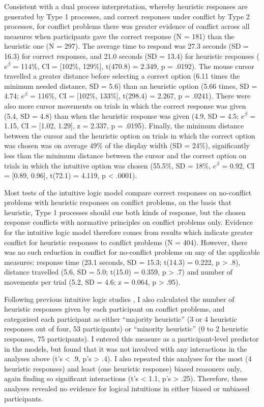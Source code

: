 Consistent with a dual process interpretation, 
whereby heuristic responses are generated by Type 1 processes,
and correct responses under conflict by Type 2 processes,
for conflict problems there was greater evidence of conflict
across all measures when participants gave the correct response (N = 181) 
than the heuristic one (N = 297).
The average time to respond was 27.3 seconds (SD = 16.3) for correct responses, 
and 21.0 seconds (SD = 13.4) for heuristic responses
($e^{\beta}$ = 114\%, CI = [102\%, 129\%],
t(470.8) = 2.349, p = .0192).
The mouse cursor travelled a greater distance 
before selecting a correct option (6.11 times the minimum needed distance, SD = 5.6) 
than an heuristic option (5.66 times, SD = 4.74;
$e^{\beta}$ = 116\%, CI = [102\%, 133\%],
t(298.4) = 2.267, p = .0241). 
There were also more cursor movements on
trials in which the correct response was given (5.4, SD = 4.8) 
than when the heuristic response was given (4.9, SD = 4.5; 
$e^{\beta}$ = 1.15, CI = [1.02, 1.29],
z = 2.337, p = .0195).
Finally, the minimum distance between 
the cursor and the heuristic option on trials in which the correct option was chosen 
was on average 49\% of the display width (SD = 24\%),
significantly less than the minimum distance between
the cursor and the correct option 
on trials in which the intuitive option was chosen (55.5\%, SD = 18\%,
$e^{\beta}$ = 0.92, CI = [0.89, 0.96],
t(72.1) = 4.119, p < .0001).

Most tests of the intuitive logic model compare
correct responses on no-conflict problems with
heuristic responses on conflict problems, 
on the basis that heuristic, Type 1 processes should cue both kinds of response, 
but the chosen response conflicts with normative principles on conflict problems only. 
Evidence for the intuitive logic model 
therefore comes from results which indicate 
greater conflict for heuristic responses to conflict problems (N = 404). 
However, there was no such reduction in conflict for no-conflict problems
on any of the applicable measures:
response time (23.1 seconds, SD = 15.3; t(14.3) = 0.222, p > .8),
distance travelled (5.6, SD = 5.0; t(15.0) = 0.359, p > .7) 
and number of movements per trial (5.2, SD = 4.6; z = 0.064, p > .95).

Following previous intuitive logic studies
\citep[e.g.][see also \citealp{Pennycook2015}]{DeNeys2011b,Mevel2014},
I also calculated the number of heuristic responses given
by each participant on conflict problems, 
and categorised each participant as either
``majority heuristic'' (3 or 4 heuristic responses out of four, 53 participants)
or ``minority heuristic'' (0 to 2 heuristic responses, 75 participants). 
I entered this measure as a participant-level predictor in the models, 
but found that it was not involved with any interactions in the analyses above
(t's < .9, p's > .4). 
I also repeated this analyses for the most (4 heuristic responses) 
and least (one heuristic response) biased reasoners only, 
again finding so significant interactions (t's < 1.1, p's > .25).
Therefore, these analyses revealed no evidence for logical intuitions
in either biased or unbiased participants.

